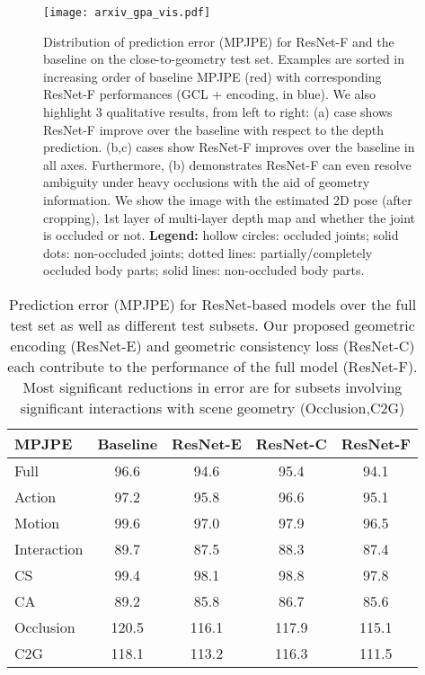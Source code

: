 \documentclass[times,referee,twocolumn,final,authoryear]{elsarticle}
\begin{document}
\begin{figure*}[t]
\begin{center}
   \texttt{[image: arxiv\_gpa\_vis.pdf]}
\end{center}
   \caption{Distribution of prediction error (MPJPE) for ResNet-F and the baseline
   on the close-to-geometry test set. Examples are sorted in increasing order of 
   baseline MPJPE (red) with
   corresponding ResNet-F performances (GCL + encoding, in blue). We also highlight
   3 qualitative results, from left to right:  (a)
   case shows ResNet-F improve over the baseline with respect to the depth
   prediction. (b,c) cases show ResNet-F improves over the baseline in all
    axes. Furthermore, (b) demonstrates ResNet-F can even resolve 
   ambiguity under heavy occlusions with the aid of geometry information.  We
   show the image with the estimated 2D pose (after cropping), 1st layer of
   multi-layer depth map and whether the joint is occluded or not.
   \textbf{Legend:} hollow circles: occluded joints; solid dots: non-occluded
   joints; dotted lines: partially/completely occluded body parts; solid lines:
   non-occluded body parts.}
\label{fig:sucvis}
\end{figure*}



\begin{table}[t]
\begin{center}
\small
\begin{tabular}{l|c|c|c|c}
\hline
MPJPE & Baseline & ResNet-E & ResNet-C & ResNet-F \\
\hline
Full & 96.6 & 94.6 &  95.4 & 94.1 \\
\hline\hline
Action & 97.2 & 95.8 & 96.6 & 95.1 \\
Motion & 99.6 & 97.0 & 97.9 & 96.5 \\
Interaction & 89.7 & 87.5 & 88.3 & 87.4 \\
\hline
\hline
CS & 99.4 & 98.1 & 98.8 & 97.8 \\
CA & 89.2 & 85.8 &  86.7 & 85.6 \\
\hline
\hline
Occlusion & 120.5 & 116.1 & 117.9 & 115.1 \\
C2G & 118.1 & 113.2 & 116.3 & 111.5  \\
\hline
\end{tabular}
\end{center}
\caption{Prediction error (MPJPE) for ResNet-based models over the full test set as
well as different test subsets. Our proposed geometric encoding (ResNet-E) and geometric 
consistency loss (ResNet-C) each contribute to the performance of the full model 
(ResNet-F). Most significant reductions in error are for subsets involving significant 
interactions with scene geometry (Occlusion,C2G)}
\label{table:mpjpe-p-resnet}
\end{table}
\end{document}
